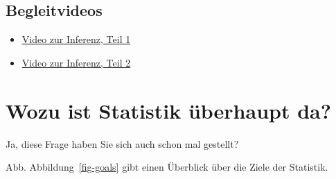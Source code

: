 \documentclass[
  a4paper,
  DIV=11]{scrreprt}
\providecommand{\tightlist}{%
  \setlength{\itemsep}{0pt}\setlength{\parskip}{0pt}}\usepackage{longtable,booktabs,array}
\theoremstyle{definition}
\theoremstyle{remark}
\begin{document}
\hypertarget{begleitvideos}{%
\subsection{Begleitvideos}\label{begleitvideos}}

\begin{itemize}
\tightlist
\item
  \href{https://youtu.be/gcwWwBy0kPI}{Video zur Inferenz, Teil 1}
\item
  \href{https://https://youtu.be/QNMVi6IqQ90}{Video zur Inferenz, Teil
  2}
\end{itemize}

\hypertarget{wozu-ist-statistik-uxfcberhaupt-da}{%
\section{Wozu ist Statistik überhaupt
da?}\label{wozu-ist-statistik-uxfcberhaupt-da}}

Ja, diese Frage haben Sie sich auch schon mal gestellt?

Abb. Abbildung~\ref{fig-goals} gibt einen Überblick über die Ziele der
Statistik.
\end{document}
